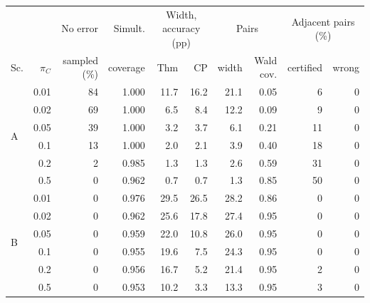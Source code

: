 \begin{tabular}{lrrrrrrrrr}
\toprule
 & & No error & Simult. & \multicolumn{2}{c}{Width, accuracy (pp)} & \multicolumn{2}{c}{Pairs} & \multicolumn{2}{c}{Adjacent pairs (\%)} \\
\cmidrule(lr){5-6}\cmidrule(lr){7-8}\cmidrule(lr){9-10}
Sc. & $\pi_C$ & sampled (\%) & coverage & Thm & CP & width & Wald cov. & certified & wrong \\
\midrule
\multirow{6}{*}{A} & 0.01 & 84 & 1.000 & 11.7 & 16.2 & 21.1 & 0.05 & 6 & 0 \\
 & 0.02 & 69 & 1.000 & 6.5 & 8.4 & 12.2 & 0.09 & 9 & 0 \\
 & 0.05 & 39 & 1.000 & 3.2 & 3.7 & 6.1 & 0.21 & 11 & 0 \\
 & 0.1 & 13 & 1.000 & 2.0 & 2.1 & 3.9 & 0.40 & 18 & 0 \\
 & 0.2 & 2 & 0.985 & 1.3 & 1.3 & 2.6 & 0.59 & 31 & 0 \\
 & 0.5 & 0 & 0.962 & 0.7 & 0.7 & 1.3 & 0.85 & 50 & 0 \\
\midrule
\multirow{6}{*}{B} & 0.01 & 0 & 0.976 & 29.5 & 26.5 & 28.2 & 0.86 & 0 & 0 \\
 & 0.02 & 0 & 0.962 & 25.6 & 17.8 & 27.4 & 0.95 & 0 & 0 \\
 & 0.05 & 0 & 0.959 & 22.0 & 10.8 & 26.0 & 0.95 & 0 & 0 \\
 & 0.1 & 0 & 0.955 & 19.6 & 7.5 & 24.3 & 0.95 & 0 & 0 \\
 & 0.2 & 0 & 0.956 & 16.7 & 5.2 & 21.4 & 0.95 & 2 & 0 \\
 & 0.5 & 0 & 0.953 & 10.2 & 3.3 & 13.3 & 0.95 & 3 & 0 \\
\bottomrule
\end{tabular}
